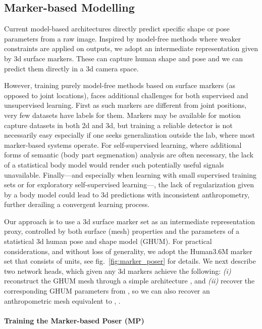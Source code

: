 \documentclass[10pt,twocolumn,letterpaper]{article}
\begin{document}
\subsection {Marker-based Modelling}
\label{subsection:MARKER_POSER}
Current model-based architectures directly predict specific shape or pose parameters from a raw image. Inspired by model-free methods where weaker constraints are applied on outputs, we adopt an intermediate representation given by 3d surface markers. These can capture human shape and pose and we can predict them directly in a 3d camera space. 

However, training purely model-free methods based on surface markers (as opposed to joint locations), faces additional challenges for both supervised and unsupervised learning. First as such markers are different from joint positions, very few datasets have labels for them. Markers may be available for motion capture datasets in both 2d and 3d, but training a reliable detector is not necessarily easy especially if one seeks generalization outside the lab, where most marker-based systems operate. For self-supervised learning, where additional forms of semantic (body part segmenation) analysis are often necessary, the lack of a statistical body model would render such potentially useful signals unavailable. Finally---and especially when learning with small supervised training sets or for exploratory self-supervised learning---, the lack of regularization given by a body model could lead to 3d predictions with inconsistent anthropometry, further derailing a convergent learning process.



Our approach is to use a 3d surface marker set as an intermediate representation proxy, controlled by both surface (mesh) properties and the parameters of a statistical 3d human pose and shape model (GHUM). For practical considerations, and without loss of generality, we adopt the Human3.6M marker set that consists of  units, see fig.~\ref{fig:marker_poser} for details. We next describe two network heads, which given any 3d markers  achieve the following: {\it (i)} reconstruct the GHUM mesh through a simple architecture , and {\it (ii)} recover the corresponding GHUM parameters  from , so we can also recover an anthropometric mesh equivalent to , .

\vspace{-4mm}

\paragraph{Training the Marker-based Poser (MP)}
\end{document}
